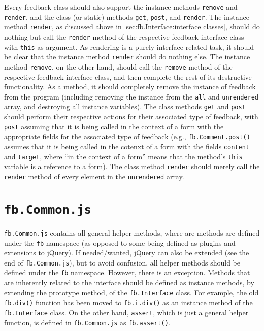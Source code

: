 \documentclass[letterpaper,12pt]{article}
\newcommand{\fb}[1]{\texttt{fb#1}}
\newcommand{\code}[1]{{\tt #1}}
\begin{document}
Every feedback class should also support the instance methods \code{remove} and \code{render}, and the class (or static) methods \code{get}, \code{post}, and \code{render}.  The instance method \code{render}, as discussed above in \ref{sec:fb.Interface:interface classes}, should do nothing but call the \code{render} method of the respective feedback interface class with \code{this} as argument.  As rendering is a purely interface-related task, it should be clear that the instance method \code{render} should do nothing else.  The instance method \code{remove}, on the other hand, should call the \code{remove} method of the respective feedback interface class, and then complete the rest of its destructive functionality.  As a method, it should completely remove the instance of feedback from the program (including removing the instance from the \code{all} and \code{unrendered} array, and destroying all instance variables).  The class methods \code{get} and \code{post} should perform their respective actions for their associated type of feedback, with \code{post} assuming that it is being called in the context of a form with the appropriate fields for the associated type of feedback (e.g., \fb{.Comment.post()} assumes that it is being called in the cotenxt of a form with the fields \code{content} and \code{target}, where ``in the context of a form'' means that the method's \code{this} variable is a reference to a form).  The class method \code{render} should merely call the \code{render} method of every element in the \code{unrendered} array.

\section{\texorpdfstring{\code{fb.Common.js}}{fb.Common.js}}
\label{sec:fb.Common.js}
\code{fb.Common.js} contains all general helper methods, where are methods are defined under the \fb{} namespace (as opposed to some being defined as plugins and extensions to jQuery).  If needed/wanted, jQuery can also be extended (see the end of \code{fb.Common.js}), but to avoid confusion, all helper methods should be defined under the \fb{} namespace.  However, there is an exception.  Methods that are inherently related to the interface should be defined as instance methods, by extending the prototype method, of the \fb{.Interface} class.  For example, the old \fb{.div()} function has been moved to \fb{.i.div()} as an instance method of the \fb{.Interface} class.  On the other hand, \code{assert}, which is just a general helper function, is defined in \code{fb.Common.js} as \fb{.assert()}.
\end{document}

